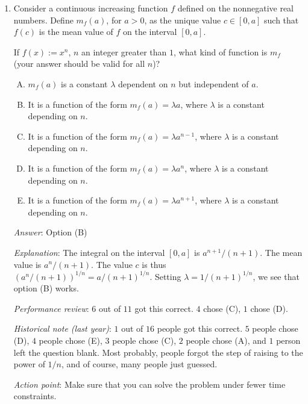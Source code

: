 \documentclass[10pt]{amsart}
\begin{document}
\begin{enumerate}
  {\em Action point}: Review the material on functions that are
  ``periodic with shift'' -- discussed when we covered graphing of
  functions.
\item Consider a continuous increasing function $f$ defined on the
  nonnegative real numbers. Define $m_f(a)$, for $a > 0$, as the
  unique value $c \in [0,a]$ such that $f(c)$ is the mean value of $f$
  on the interval $[0,a]$.
  
  If $f(x) := x^n$, $n$ an integer greater than $1$, what kind of
  function is $m_f$ (your answer should be valid for all $n$)?

  \begin{enumerate}[(A)]
  \item $m_f(a)$ is a constant $\lambda$ dependent on $n$ but
    independent of $a$.
  \item It is a function of the form $m_f(a) = \lambda a$, where
    $\lambda$ is a constant depending on $n$.
  \item It is a function of the form $m_f(a) = \lambda a^{n-1}$, where
    $\lambda$ is a constant depending on $n$.
  \item It is a function of the form $m_f(a) = \lambda a^n$, where
    $\lambda$ is a constant depending on $n$.
  \item It is a function of the form $m_f(a) = \lambda a^{n+1}$, where
    $\lambda$ is a constant depending on $n$.
  \end{enumerate}

  {\em Answer}: Option (B)

  {\em Explanation}: The integral on the interval $[0,a]$ is
  $a^{n+1}/(n + 1)$. The mean value is $a^n/(n + 1)$. The value $c$ is
  thus $(a^n/(n + 1))^{1/n} = a/(n + 1)^{1/n}$. Setting $\lambda =
  1/(n + 1)^{1/n}$, we see that option (B) works.
  
  {\em Performance review}: $6$ out of $11$ got this correct. $4$
  chose (C), $1$ chose (D).

  {\em Historical note (last year)}: $1$ out of $16$ people got this
  correct. $5$ people chose (D), $4$ people chose (E), $3$ people
  chose (C), $2$ people chose (A), and $1$ person left the question
  blank. Most probably, people forgot the step of raising to the power
  of $1/n$, and of course, many people just guessed.

  {\em Action point}: Make sure that you can solve the problem under
  fewer time constraints.
\end{enumerate}
\end{document}
